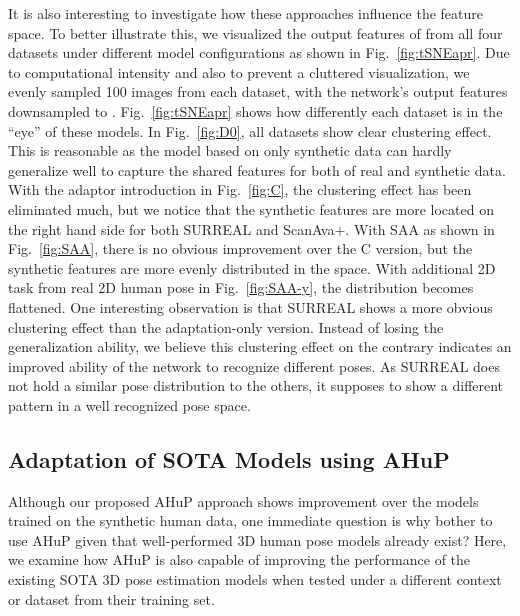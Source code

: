 \documentclass[twocolumn]{svjour3}          \smartqed  \usepackage{graphicx}
\newcommand{\figref}[1]{Fig.~\ref{#1}}
\begin{document}
It is also interesting to investigate how these approaches influence the feature space. To better illustrate this, we visualized the output features of  from all four datasets under different model configurations as shown in \figref{fig:tSNEapr}.
Due to computational intensity and also to prevent a cluttered  visualization, we evenly sampled 100 images from each dataset, with the  network's output features downsampled to . 
\figref{fig:tSNEapr} shows how differently each dataset is in the ``eye'' of these models. In \figref{fig:D0}, all datasets show clear clustering effect. 
This is reasonable as the model based on only synthetic data can hardly generalize well to capture the shared features for both of real and synthetic data. 
With the adaptor introduction in \figref{fig:C}, the clustering effect has been eliminated much, but we notice that the synthetic features are more located on the right hand side for both SURREAL and ScanAva+. With SAA as shown in \figref{fig:SAA}, there is no obvious improvement over the C version, but the synthetic features are more evenly distributed in the space. With additional 2D task from real 2D human pose in \figref{fig:SAA-y}, the distribution becomes flattened. One interesting observation is that SURREAL shows a more obvious clustering effect than the adaptation-only version. 
Instead of losing the generalization ability, we believe this clustering effect on the contrary indicates an improved ability of the network to recognize different poses.  As SURREAL does not hold a similar pose distribution to the others, it supposes to show a different pattern in a well recognized pose space.

\subsection{Adaptation of SOTA Models using AHuP}
Although our proposed AHuP approach shows improvement over the models trained on the synthetic human data, 
one immediate question is why bother to use AHuP given that well-performed 3D human pose models already exist? 
Here, we examine how AHuP is also capable of improving the performance of the existing SOTA 3D pose estimation models when tested under a different context or dataset from their training set. 
\end{document}
